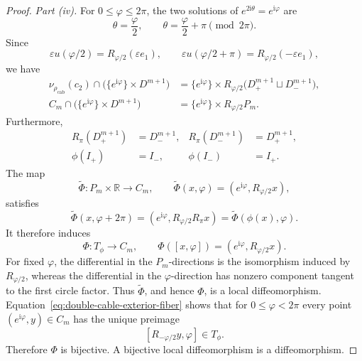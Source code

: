 \documentclass[10pt,a4paper]{amsart}
\newcommand{\rhoCab}{{\rho_{\mathrm{cab}}}}
\begin{document}
\begin{proof}
\emph{Part \textup{(iv)}.}
For $0\le\varphi\le2\pi$, the two solutions of
$e^{2\mathrm i\theta}=e^{\mathrm i\varphi}$ are
\[
 \theta=\frac\varphi2,
 \qquad
 \theta=\frac\varphi2+\pi
 \pmod{2\pi}.
\]
Since
\[
 \varepsilon u(\varphi/2)=R_{\varphi/2}(\varepsilon e_1),
 \qquad
 \varepsilon u(\varphi/2+\pi)=R_{\varphi/2}(-\varepsilon e_1),
\]
we have
\begin{align}
 \nu_{\rhoCab}(c_2)\cap
 \bigl(\{e^{\mathrm i\varphi}\}\times D^{m+1}\bigr)
 &=\{e^{\mathrm i\varphi}\}\times
 R_{\varphi/2}\bigl(D^{m+1}_+\sqcup D^{m+1}_-\bigr),
                                                   \label{eq:double-cable-tube-fiber}\\
 C_m\cap\bigl(\{e^{\mathrm i\varphi}\}\times D^{m+1}\bigr)
 &=\{e^{\mathrm i\varphi}\}\times R_{\varphi/2}P_m.
                                                   \label{eq:double-cable-exterior-fiber}
\end{align}
Furthermore,
\begin{align*}
 R_\pi(D^{m+1}_+)&=D^{m+1}_-,
 &R_\pi(D^{m+1}_-)&=D^{m+1}_+,\\
 \phi(I_+)&=I_-,
 &\phi(I_-)&=I_+.
\end{align*}
The map
\[
 \widetilde\Phi:P_m\times\mathbb R\longrightarrow C_m,
 \qquad
 \widetilde\Phi(x,\varphi)
   =(e^{\mathrm i\varphi},R_{\varphi/2}x),
\]
satisfies
\[
 \widetilde\Phi(x,\varphi+2\pi)
 =(e^{\mathrm i\varphi},R_{\varphi/2}R_\pi x)
 =\widetilde\Phi(\phi(x),\varphi).
\]
It therefore induces
\[
 \Phi:T_\phi\longrightarrow C_m,
 \qquad
 \Phi([x,\varphi])
   =(e^{\mathrm i\varphi},R_{\varphi/2}x).
\]
For fixed $\varphi$, the differential in the $P_m$-directions is the
isomorphism induced by $R_{\varphi/2}$, whereas the differential in the
$\varphi$-direction has nonzero component tangent to the first circle
factor.  Thus $\widetilde\Phi$, and hence $\Phi$, is a local
diffeomorphism.  Equation~\eqref{eq:double-cable-exterior-fiber} shows
that for $0\le\varphi<2\pi$ every point
$(e^{\mathrm i\varphi},y)\in C_m$ has the unique preimage
\[
 [R_{-\varphi/2}y,\varphi]\in T_\phi.
\]
Therefore $\Phi$ is bijective.  A bijective local diffeomorphism is a
diffeomorphism.
\end{proof}
\end{document}
